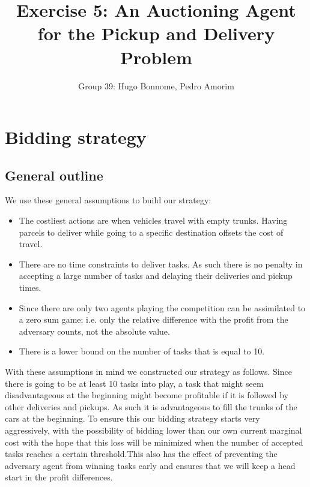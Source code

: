 \documentclass[11pt]{article}
\title{\bf Exercise 5: An Auctioning Agent for the Pickup and Delivery Problem}
\author{Group 39: Hugo Bonnome, Pedro Amorim}
\begin{document}
\maketitle

\section{Bidding strategy}



\subsection{General outline}
We use these general assumptions to build our strategy:
\begin{itemize}
\item The costliest actions are when vehicles travel with empty trunks. Having
  parcels to deliver while going to a specific destination offsets the cost of
  travel.
\item There are no time constraints to deliver tasks. As such there is no
  penalty in accepting a large number of tasks and delaying their deliveries and
  pickup times.
\item Since there are only two agents playing the competition can be assimilated
  to a zero sum game; i.e. only the relative difference with the profit from the
  adversary counts, not the absolute value.
\item There is a lower bound on the number of tasks that is equal to 10.
\end{itemize}

With these assumptions in mind we constructed our strategy as follows. Since
there is going to be at least 10 tasks into play, a task that might seem
disadvantageous at the beginning might become profitable if it is followed by
other deliveries and pickups. As such it is advantageous to fill the trunks of
the cars at the beginning. To ensure this our bidding strategy starts very
aggressively, with the possibility of bidding lower than our own current
marginal cost with the hope that this loss will be minimized when the number of
accepted tasks reaches a certain threshold.This also has the effect of
preventing the adversary agent from winning tasks early and ensures that we will
keep a head start in the profit differences.
\end{document}
